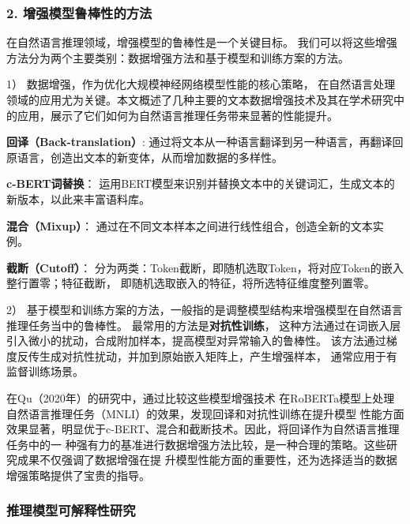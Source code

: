 \subsubsection*{2. 增强模型鲁棒性的方法}
在自然语言推理领域，增强模型的鲁棒性是一个关键目标。
我们可以将这些增强方法分为两个主要类别：数据增强方法和基于模型和训练方案的方法。

1） 数据增强，作为优化大规模神经网络模型性能的核心策略，
在自然语言处理领域的应用尤为关键。本文概述了几种主要的文本数据增强技术及其在学术研究中的应用，展示了它们如何为自然语言推理任务带来显著的性能提升。

\textbf{回译（Back-translation）}\cite{sennrich2016improving,edunov2018understanding,xie2020unsupervised}:
通过将文本从一种语言翻译到另一种语言，再翻译回原语言，创造出文本的新变体，从而增加数据的多样性。

\textbf{c-BERT词替换}\cite{wu2019conditional}：
运用BERT模型来识别并替换文本中的关键词汇，生成文本的新版本，以此来丰富语料库。

\textbf{混合（Mixup）}\cite{guo2019augmenting,chen2020mixtext}：
通过在不同文本样本之间进行线性组合，创造全新的文本实例。

\textbf{截断（Cutoff）}\cite{shen2020simple}：
分为两类：Token截断，即随机选取Token，将对应Token的嵌入整行置零；特征截断，
即随机选取嵌入的特征，将所选特征维度整列置零。

2） 基于模型和训练方案的方法，一般指的是调整模型结构来增强模型在自然语言推理任务当中的鲁棒性。
最常用的方法是\textbf{对抗性训练}\cite{zhu2019freelb,jiang2020smart}，
这种方法通过在词嵌入层引入微小的扰动，合成附加样本，提高模型对异常输入的鲁棒性。
该方法通过梯度反传生成对抗性扰动，并加到原始嵌入矩阵上，产生增强样本，
通常应用于有监督训练场景。

在Qu（2020年）\cite{qu2020coda}的研究中，通过比较这些模型增强技术
在RoBERTa模型上处理自然语言推理任务（MNLI）的效果，发现回译和对抗性训练在提升模型
性能方面效果显著，明显优于c-BERT、混合和截断技术。因此，将回译作为自然语言推理任务中的一
种强有力的基准进行数据增强方法比较，是一种合理的策略。这些研究成果不仅强调了数据增强在提
升模型性能方面的重要性，还为选择适当的数据增强策略提供了宝贵的指导。

\subsubsection{推理模型可解释性研究}
\label{sec1:interpretability}

